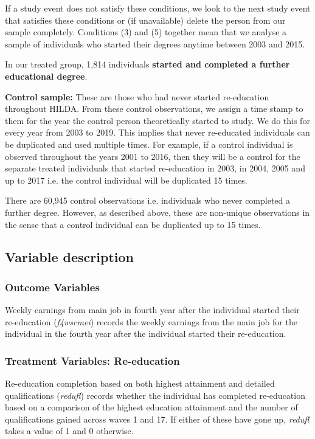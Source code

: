 \documentclass[12pt, a4paper]{article}
\begin{document}
If a study event does not satisfy these conditions, we look to the next study event that satisfies these conditions or (if unavailable) delete the person from our sample completely. Conditions (3) and (5) together mean that we analyse a sample of individuals who started their degrees anytime between 2003 and 2015.

In our treated group, 1,814 individuals \textbf{started and completed a further educational degree}. 

\textbf{Control sample:} These are those who had never started re-education throughout HILDA. From these control observations, we assign a time stamp to them for the year the control person theoretically started to study. We do this for every year from 2003 to 2019. This implies that never re-educated individuals can be duplicated and used multiple times. For example, if a control individual is observed throughout the years 2001 to 2016, then they will be a control for the separate treated individuals that started re-education in 2003, in 2004, 2005 and up to 2017 i.e. the control individual will be duplicated 15 times.

There are 60,945 control observations i.e. individuals who never completed a further degree. However, as described above, these are non-unique observations in the sense that a control individual can be duplicated up to 15 times. 

\subsection{Variable description}

\subsubsection{Outcome Variables}
Weekly earnings from main job in fourth year after the individual started their re-education (\textit{f4\textunderscore{}wscmei}) records the weekly earnings from the main job for the individual in the fourth year after the individual started their re-education. 

\subsubsection{Treatment Variables: Re-education}
Re-education completion based on both highest attainment and detailed qualifications (\textit{redufl}) records whether the individual has completed re-education based on a comparison of the highest education attainment and the number of qualifications gained across waves 1 and 17. If either of these have gone up, \textit{redufl} takes a value of 1 and 0 otherwise. 
\end{document}
